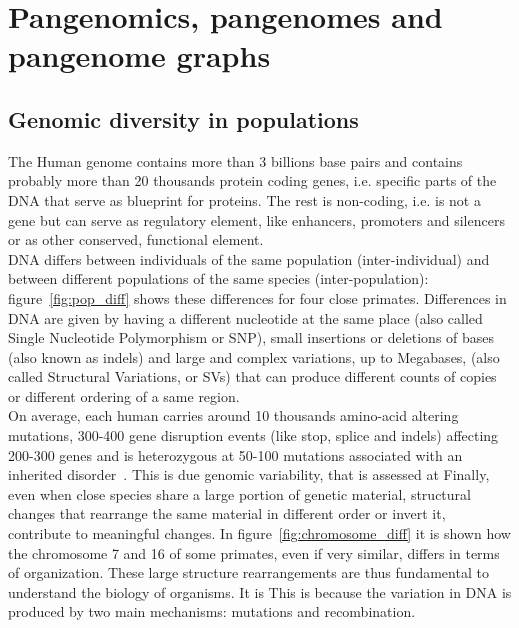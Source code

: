 \section*{Pangenomics, pangenomes and pangenome graphs}
\label{sec:background:pangenomics}
\subsection*{Genomic diversity in populations}
The Human genome contains more than 3 billions base pairs and contains probably more than 20 thousands protein coding genes, i.e. specific parts of the DNA that serve as blueprint for proteins. The rest is non-coding, i.e. is not a gene but can serve as regulatory element, like enhancers, promoters and silencers or as other conserved, functional element.\\
DNA differs between individuals of the same population (inter-individual) and between different populations of the same species (inter-population): figure~\ref{fig:pop_diff} shows these differences for four close primates. Differences in DNA are given by having a different nucleotide at the same place (also called Single Nucleotide Polymorphism or SNP), small insertions or deletions of bases (also known as indels) and large and complex variations, up to Megabases, (also called Structural Variations, or SVs) that can produce different counts of copies or different ordering of a same region. \\
On average, each human carries around 10 thousands amino-acid altering mutations, 300-400 gene disruption events (like stop, splice and indels) affecting 200-300 genes and is heterozygous at 50-100 mutations associated with an inherited disorder~\cite{genome_diversity_quintana}. This is due genomic variability, that is assessed at
Finally, even when close species share a large portion of genetic material, structural changes that rearrange the same material in different order or invert it, contribute to meaningful changes. In figure~\ref{fig:chromosome_diff} it is shown how the chromosome 7 and 16 of some primates, even if very similar, differs in terms of organization. These large structure rearrangements are thus fundamental to understand the biology of organisms.
It is 
This is because the variation in DNA is produced by two main mechanisms: mutations and recombination. 

